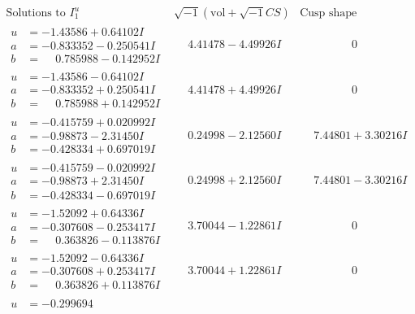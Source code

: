 \documentclass[1p]{elsarticle_modified}
\theoremstyle{definition}
\newcommand{\I}{\sqrt{-1}}
\begin{document}
$$\begin{array}{c|c|c}
\text{Solutions to }I^u_{1}& \I (\text{vol} + \sqrt{-1}CS) & \text{Cusp shape}\\
 \hline 
\begin{aligned}
u &= -1.43586 + 0.64102 I \\
a &= -0.833352 - 0.250541 I \\
b &= \phantom{-}0.785988 - 0.142952 I\end{aligned}
 & \phantom{-}4.41478 - 4.49926 I & \phantom{-0.000000 } 0 \\ \hline\begin{aligned}
u &= -1.43586 - 0.64102 I \\
a &= -0.833352 + 0.250541 I \\
b &= \phantom{-}0.785988 + 0.142952 I\end{aligned}
 & \phantom{-}4.41478 + 4.49926 I & \phantom{-0.000000 } 0 \\ \hline\begin{aligned}
u &= -0.415759 + 0.020992 I \\
a &= -0.98873 - 2.31450 I \\
b &= -0.428334 + 0.697019 I\end{aligned}
 & \phantom{-}0.24998 - 2.12560 I & \phantom{-}7.44801 + 3.30216 I \\ \hline\begin{aligned}
u &= -0.415759 - 0.020992 I \\
a &= -0.98873 + 2.31450 I \\
b &= -0.428334 - 0.697019 I\end{aligned}
 & \phantom{-}0.24998 + 2.12560 I & \phantom{-}7.44801 - 3.30216 I \\ \hline\begin{aligned}
u &= -1.52092 + 0.64336 I \\
a &= -0.307608 - 0.253417 I \\
b &= \phantom{-}0.363826 - 0.113876 I\end{aligned}
 & \phantom{-}3.70044 - 1.22861 I & \phantom{-0.000000 } 0 \\ \hline\begin{aligned}
u &= -1.52092 - 0.64336 I \\
a &= -0.307608 + 0.253417 I \\
b &= \phantom{-}0.363826 + 0.113876 I\end{aligned}
 & \phantom{-}3.70044 + 1.22861 I & \phantom{-0.000000 } 0 \\ \hline\begin{aligned}
u &= -0.299694\phantom{ +0.000000I} \\

\end{aligned}
\end{array}$$
\end{document}
